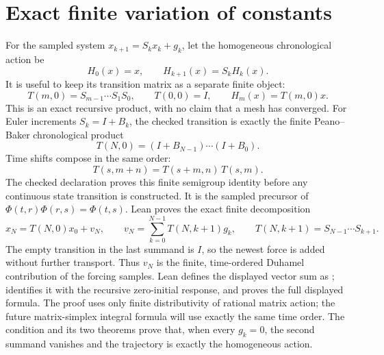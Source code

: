 \section{Exact finite variation of constants}

\begin{theorem}
\label{thm:discrete-variation-of-constants}
\leanok
For the sampled system \(x_{k+1}=S_kx_k+g_k\), let the homogeneous
chronological action be
\[
 H_0(x)=x,\qquad H_{k+1}(x)=S_kH_k(x).
\]
It is useful to keep its transition matrix as a separate finite object:
\[
 T(m,0)=S_{m-1}\cdots S_1S_0,\qquad T(0,0)=I,
 \qquad H_m(x)=T(m,0)x.
\]
This is an exact recursive product, with no claim that a mesh has converged.
For Euler increments \(S_k=I+B_k\), the checked transition is exactly the
finite Peano--Baker chronological product
\[
 T(N,0)=(I+B_{N-1})\cdots(I+B_0).
\]
Time shifts compose in the same order:
\[
 T(s,m+n)=T(s+m,n)\,T(s,m).
\]
The checked declaration  proves this
finite semigroup identity before any continuous state transition is
constructed. It is the sampled precursor of
\(\Phi(t,r)\Phi(r,s)=\Phi(t,s)\).
Lean proves the exact finite decomposition
\[
 x_N=T(N,0)x_0+v_N,\qquad
 v_N=\sum_{k=0}^{N-1}T(N,k+1)g_k,
 \qquad T(N,k+1)=S_{N-1}\cdots S_{k+1}.
\]
The empty transition in the last summand is \(I\), so the newest force is
added without further transport. Thus \(v_N\) is the finite, time-ordered
Duhamel contribution of the forcing samples. Lean defines the displayed vector
sum as ;
 identifies it with the
recursive zero-initial response, and
 proves the full displayed
formula. The proof uses only finite distributivity of rational matrix action;
the future matrix-simplex integral formula will use exactly the same time
order. The  condition and its two theorems prove that, when
every \(g_k=0\), the second summand vanishes and the trajectory is exactly the
homogeneous action.
\end{theorem}

